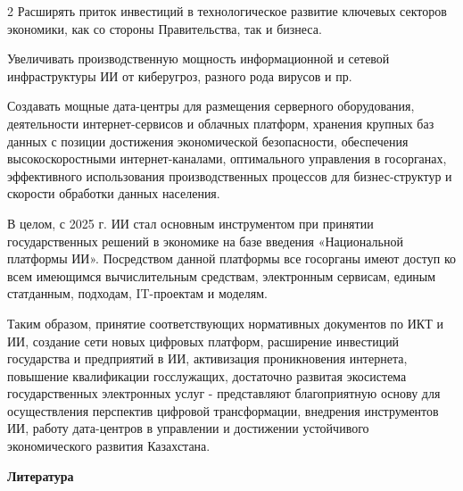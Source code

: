 \begin{multicols}{2}
Расширять приток инвестиций в технологическое развитие ключевых секторов
экономики, как со стороны Правительства, так и бизнеса.

Увеличивать производственную мощность информационной и сетевой
инфраструктуры ИИ от киберугроз, разного рода вирусов и пр.

Создавать мощные дата-центры для размещения серверного оборудования,
деятельности интернет-сервисов и облачных платформ, хранения крупных баз
данных с позиции достижения экономической безопасности, обеспечения
высокоскоростными интернет-каналами, оптимального управления в
госорганах, эффективного использования производственных процессов для
бизнес-структур и скорости обработки данных населения.

В целом, с 2025 г. ИИ стал основным инструментом при принятии
государственных решений в экономике на базе введения «Национальной
платформы ИИ». Посредством данной платформы все госорганы имеют доступ
ко всем имеющимся вычислительным средствам, электронным сервисам, единым
статданным, подходам, IT-проектам и моделям.

Таким образом, принятие соответствующих нормативных документов по ИКТ и
ИИ, создание сети новых цифровых платформ, расширение инвестиций
государства и предприятий в ИИ, активизация проникновения интернета,
повышение квалификации госслужащих, достаточно развитая экосистема
государственных электронных услуг - представляют благоприятную основу
для осуществления перспектив цифровой трансформации, внедрения
инструментов ИИ, работу дата-центров в управлении и достижении
устойчивого экономического развития Казахстана.
\end{multicols}

\begin{center}
{\bfseries Литература}
\end{center}

